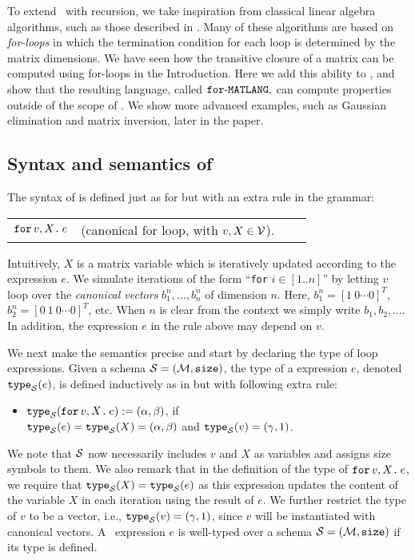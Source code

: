 
To extend \lang\ with recursion, we take inspiration from classical linear algebra algorithms, such as those described in \cite{num}. Many of these algorithms are based on \textit{for-loops} in which the termination condition for each loop is determined by the matrix dimensions. We have seen how the transitive closure of a matrix can be computed using for-loops in the Introduction. Here we add this ability to \lang, and show that the resulting language, called $\texttt{for}\text{-}\texttt{MATLANG},$ can compute properties outside of the scope of \lang. We show more advanced examples, such as Gaussian elimination and matrix inversion, later in the paper. 

\subsection{Syntax and semantics of \langfor}\label{ss:fML} The syntax of \langfor is defined just as for \lang but with an extra rule in the grammar:
\medskip

\begin{tabular}{lcll}
 $\texttt{for}\, v,X \texttt{.}\, e$ & (canonical for loop, with $v, X \in \mathcal{V}$). 
\end{tabular}

\medskip
\noindent Intuitively, $X$ is a matrix variable which is iteratively updated according to the expression $e$. We simulate iterations of the form ``\texttt{for} $i\in [1..n]$'' by letting $v$ loop over the \textit{canonical vectors} $b_1^n,\ldots,b_n^n$ of dimension $n$. Here,
$b_1^n = [1\ 0 \cdots 0]^T$, $b_2^n = [0\ 1\ 0 \cdots 0]^T$, etc. When $n$ is clear from the context we simply write $b_1,b_2,\ldots$. In addition, the expression $e$ in the rule above may depend on $v$. 

We next make the semantics precise and start by
declaring the type of loop expressions.
Given a schema $\mathcal{S}=(\mathcal{M},\texttt{size})$, the type of a \langfor expression $e$, denoted $\texttt{type}_{\mathcal{S}}(e)$, is defined inductively as in \lang but with following extra rule:
\begin{itemize}
\item $\texttt{type}_{\mathcal{S}}(\texttt{for}\, v,X \texttt{.}\, e) := (\alpha,\beta)$, if \\
$\texttt{type}_{\mathcal{S}}(e)=\texttt{type}_{\mathcal{S}}(X) =(\alpha,\beta)$ and $\texttt{type}_{\mathcal{S}}(v) = (\gamma,1)$.
\end{itemize}
We note that $\mathcal{S}$ now necessarily includes $v$ and $X$ as variables and assigns size symbols to them.
We also remark that in the definition of the type of $\texttt{for}\, v,X \texttt{.}\, e$, we require that $\texttt{type}_{\mathcal{S}}(X) = \texttt{type}_{\mathcal{S}}(e)$ as this expression updates the content of the variable $X$ in each iteration using the result of $e$. We further restrict the type of 
$v$ to be a vector, i.e., $\texttt{type}_{\mathcal{S}}(v)=(\gamma,1)$, since $v$ will be instantiated with canonical vectors.
A \langfor\ expression $e$ is well-typed over a schema $\mathcal{S}=(\mathcal{M},\texttt{size})$ if its type is defined. 

